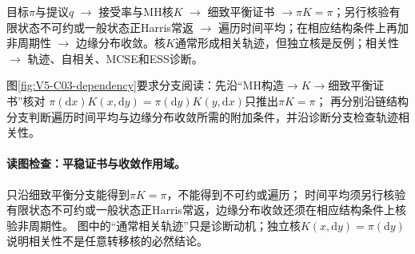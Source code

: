 \begin{SLCompactOpeningSection}
\label{struct:V5-C03-CH04}
\begin{dependencybox}
目标$\pi$与提议$q$
$\to$ 接受率与MH核$K$
$\to$ 细致平衡证书
$\to \pi K=\pi$；另行核验有限状态不可约或一般状态正Harris常返
$\to$ 遍历时间平均；在相应结构条件上再加非周期性
$\to$ 边缘分布收敛。核$K$通常形成相关轨迹，但独立核是反例；相关性
$\to$ 轨迹、自相关、MCSE和ESS诊断。
\end{dependencybox}
图\ref{fig:V5-C03-dependency}要求分支阅读：先沿“MH构造$\to K\to$细致平衡证书”核对
$\pi(\mathrm dx)K(x,\mathrm dy)=\pi(\mathrm dy)K(y,\mathrm dx)$只推出$\pi K=\pi$；
再分别沿链结构分支判断遍历时间平均与边缘分布收敛所需的附加条件，并沿诊断分支检查轨迹相关性。

\FloatBarrier
\paragraph{读图检查：平稳证书与收敛作用域。}只沿细致平衡分支能得到$\pi K=\pi$，不能得到不可约或遍历；
时间平均须另行核验有限状态不可约或一般状态正Harris常返，边缘分布收敛还须在相应结构条件上核验非周期性。
图中的“通常相关轨迹”只是诊断动机；独立核$K(x,\mathrm dy)=\pi(\mathrm dy)$说明相关性不是任意转移核的必然结论。\par
\end{SLCompactOpeningSection}


